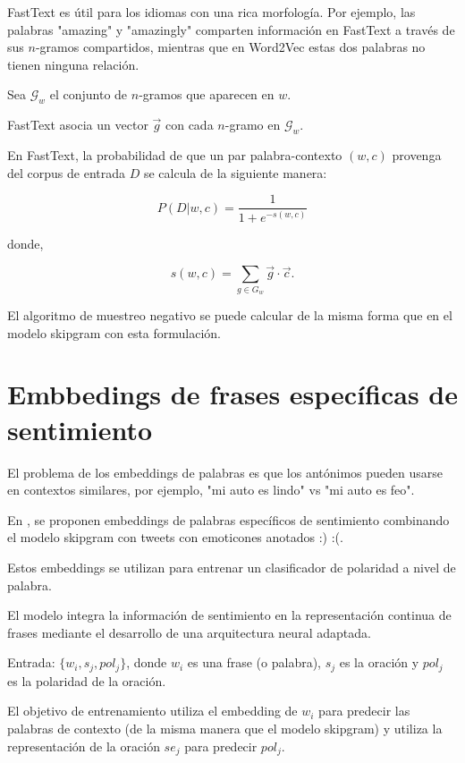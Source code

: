 FastText es útil para los idiomas con una rica morfología. Por ejemplo, las palabras "amazing" y "amazingly" comparten información en FastText a través de sus $n$-gramos compartidos, mientras que en Word2Vec estas dos palabras no tienen ninguna relación.

Sea $\mathcal{G}_{w}$ el conjunto de $n$-gramos que aparecen en $w$.

FastText asocia un vector $\vec{g}$ con cada $n$-gramo en $\mathcal{G}_{w}$.

En FastText, la probabilidad de que un par palabra-contexto $(w, c)$ provenga del corpus de entrada $D$ se calcula de la siguiente manera:

\begin{displaymath}
P(D | w, c) = \frac{1}{1+e^{-s(w,c)}}
\end{displaymath}

donde,

\begin{displaymath}
s(w,c) = \sum_{g \in {G}_{w}} \vec{g} \cdot \vec{c}.
\end{displaymath}

El algoritmo de muestreo negativo se puede calcular de la misma forma que en el modelo skipgram con esta formulación.

\section{Embbedings de frases específicas de sentimiento}
El problema de los embeddings de palabras es que los antónimos pueden usarse en contextos similares, por ejemplo, "mi auto es lindo" vs "mi auto es feo".

En \cite{TangCol14}, se proponen embeddings de palabras específicos de sentimiento combinando el modelo skipgram con tweets con emoticones anotados :) :(.

Estos embeddings se utilizan para entrenar un clasificador de polaridad a nivel de palabra.

El modelo integra la información de sentimiento en la representación continua de frases mediante el desarrollo de una arquitectura neural adaptada.

Entrada: $\{w_i,s_j,pol_j\}$, donde $w_i$ es una frase (o palabra), $s_j$ es la oración y $pol_j$ es la polaridad de la oración.

El objetivo de entrenamiento utiliza el embedding de $w_i$ para predecir las palabras de contexto (de la misma manera que el modelo skipgram) y utiliza la representación de la oración $se_j$ para predecir $pol_j$.

